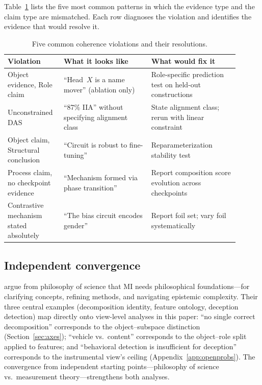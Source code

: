 \documentclass{article}
\begin{document}
Table~\ref{tab:violations} lists the five most common patterns
in which the evidence type and the claim type are mismatched.
Each row diagnoses the violation and identifies the evidence that
would resolve it.

\begin{table}[H]
\centering
\small
\begin{tabular}{p{0.20\linewidth}p{0.35\linewidth}p{0.35\linewidth}}
\toprule
\textbf{Violation} & \textbf{What it looks like} & \textbf{What would fix it} \\
\midrule
Object evidence, Role claim
  & ``Head~$X$ is a name mover'' (ablation only)
  & Role-specific prediction test on held-out constructions \\[4pt]
Unconstrained DAS
  & ``87\% IIA'' without specifying alignment class
  & State alignment class; rerun with linear constraint \citep{sutter2025} \\[4pt]
Object claim, Structural conclusion
  & ``Circuit is robust to fine-tuning''
  & Reparameterization stability test \\[4pt]
Process claim, no checkpoint evidence
  & ``Mechanism formed via phase transition''
  & Report composition score evolution across checkpoints \\[4pt]
Contrastive mechanism stated absolutely
  & ``The bias circuit encodes gender''
  & Report foil set; vary foil systematically \\
\bottomrule
\end{tabular}
\caption{Five common coherence violations and their resolutions.}
\label{tab:violations}
\end{table}

\subsection{Independent convergence}

\citet{williams2025} argue from philosophy of science that MI needs
philosophical foundations---for clarifying concepts, refining methods,
and navigating epistemic complexity.  Their three central examples
(decomposition identity, feature ontology, deception detection) map
directly onto view-level analyses in this paper: ``no single correct
decomposition'' corresponds to the object--subspace distinction
(Section~\ref{sec:axes}); ``vehicle vs.\ content'' corresponds to the
object--role split applied to features; and ``behavioral detection is
insufficient for deception'' corresponds to the instrumental view's
ceiling (Appendix~\ref{app:openprobs}).  The convergence from
independent starting points---philosophy of science vs.\ measurement
theory---strengthens both analyses.
\end{document}
